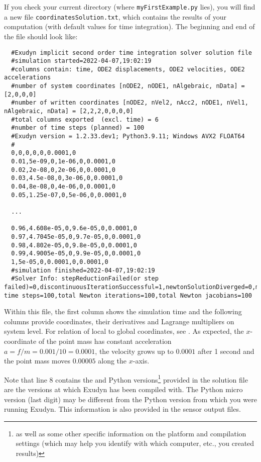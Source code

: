If you check your current directory (where \texttt{myFirstExample.py} lies), you will find a new file \texttt{coordinatesSolution.txt}, which contains the results of your computation (with default values for time integration).
The beginning and end of the file should look like: \vspace{6pt}\\
\begin{lstlisting}
  #Exudyn implicit second order time integration solver solution file
  #simulation started=2022-04-07,19:02:19
  #columns contain: time, ODE2 displacements, ODE2 velocities, ODE2 accelerations
  #number of system coordinates [nODE2, nODE1, nAlgebraic, nData] = [2,0,0,0]
  #number of written coordinates [nODE2, nVel2, nAcc2, nODE1, nVel1, nAlgebraic, nData] = [2,2,2,0,0,0,0]
  #total columns exported  (excl. time) = 6
  #number of time steps (planned) = 100
  #Exudyn version = 1.2.33.dev1; Python3.9.11; Windows AVX2 FLOAT64
  #
  0,0,0,0,0,0.0001,0
  0.01,5e-09,0,1e-06,0,0.0001,0
  0.02,2e-08,0,2e-06,0,0.0001,0
  0.03,4.5e-08,0,3e-06,0,0.0001,0
  0.04,8e-08,0,4e-06,0,0.0001,0
  0.05,1.25e-07,0,5e-06,0,0.0001,0

  ...

  0.96,4.608e-05,0,9.6e-05,0,0.0001,0
  0.97,4.7045e-05,0,9.7e-05,0,0.0001,0
  0.98,4.802e-05,0,9.8e-05,0,0.0001,0
  0.99,4.9005e-05,0,9.9e-05,0,0.0001,0
  1,5e-05,0,0.0001,0,0.0001,0
  #simulation finished=2022-04-07,19:02:19
  #Solver Info: stepReductionFailed(or step failed)=0,discontinuousIterationSuccessful=1,newtonSolutionDiverged=0,massMatrixNotInvertible=1,total time steps=100,total Newton iterations=100,total Newton jacobians=100
\end{lstlisting}
%
Within this file, the first column shows the simulation time and the following columns provide coordinates, their derivatives and Lagrange multipliers on system level. For relation of local to global coordinates, see . As expected, the $x$-coordinate of the point mass has constant acceleration $a=f/m=0.001/10=0.0001$, the velocity grows up to $0.0001$ after 1 second and the point mass moves $0.00005$ along the $x$-axis.

Note that line 8 contains the \codeName and Python versions\footnote{as well as some other specific information on the platform and compilation settings (which may help you identify with which computer, etc., you created results)} provided in the solution file are the versions at which Exudyn has been compiled with.
The Python micro version (last digit) may be different from the Python version from which you were running Exudyn.
This information is also provided in the sensor output files.
%
\newpage
{}

